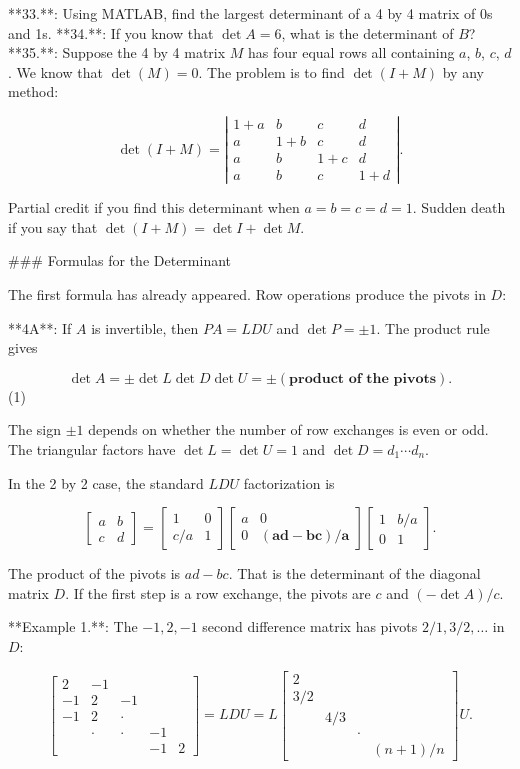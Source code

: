 

**33.**: Using MATLAB, find the largest determinant of a 4 by 4 matrix of 0s and 1s.
**34.**: If you know that \(\det A=6\), what is the determinant of \(B\)?
**35.**: Suppose the 4 by 4 matrix \(M\) has four equal rows all containing \(a\), \(b\), \(c\), \(d\). We know that \(\det(M)=0\). The problem is to find \(\det(I+M)\) by any method:

\[\det(I+M)=\left|\begin{array}{cccc}1+a&b&c&d\\ a&1+b&c&d\\ a&b&1+c&d\\ a&b&c&1+d\end{array}\right|.\]

Partial credit if you find this determinant when \(a=b=c=d=1\). Sudden death if you say that \(\det(I+M)=\det I+\det M\).

### Formulas for the Determinant

The first formula has already appeared. Row operations produce the pivots in \(D\):

**4A**: If \(A\) is invertible, then \(PA=LDU\) and \(\det P=\pm 1\). The product rule gives

\[\det A=\pm\det L\det D\det U=\pm(\textbf{product of the pivots}).\] (1)

The sign \(\pm 1\) depends on whether the number of row exchanges is even or odd. The triangular factors have \(\det L=\det U=1\) and \(\det D=d_{1}\cdots d_{n}\).

In the 2 by 2 case, the standard \(LDU\) factorization is

\[\begin{bmatrix}a&b\\ c&d\end{bmatrix}=\begin{bmatrix}1&0\\ c/a&1\end{bmatrix}\begin{bmatrix}a&0\\ 0&(\textbf{ad}-\textbf{bc})/\textbf{a}\end{bmatrix}\begin{bmatrix}1&b/a\\ 0&1\end{bmatrix}.\]

The product of the pivots is \(ad-bc\). That is the determinant of the diagonal matrix \(D\). If the first step is a row exchange, the pivots are \(c\) and \((-\det A)/c\).

**Example 1.**: The \(-1,2,-1\) second difference matrix has pivots \(2/1,3/2,\ldots\) in \(D\):

\[\begin{bmatrix}2&-1\\ -1&2&-1\\ -1&2&\cdot\\ &\cdot&\cdot&-1\\ &&&-1&2\end{bmatrix}=LDU=L\begin{bmatrix}2\\ 3/2\\ &4/3\\ &&\cdot\\ &&&(n+1)/n\end{bmatrix}U.\]